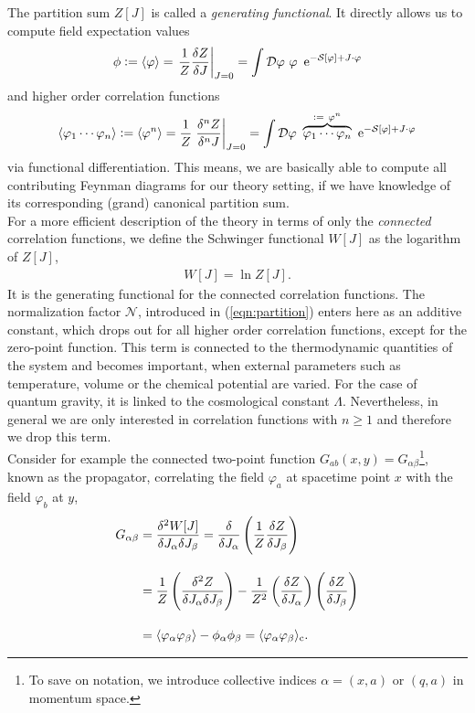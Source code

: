 The partition sum $Z[J]$ is called a \textit{generating functional}. It directly allows us to compute field expectation values
\begin{align}
	\phi := \cf{\varphi} = \eval{\frac{1}{Z}\frac{\delta Z}{\delta J}}_{J=0} = \int \D\varphi \ \varphi \ \operatorname{e}^{-\S + J\cdot\varphi}
\end{align}
and higher order correlation functions
\begin{align}
\cf{\varphi_1 \cdots \varphi_n} := \cf{\varphi^n} = \frac{1}{Z}\eval{\frac{\delta^n Z}{\delta^n J}}_{J=0} = \int \D\varphi \ \overbrace{\varphi_1 \cdots \varphi_n}^{:= \ \varphi^n} \ \operatorname{e}^{-\S + J\cdot\varphi}
\end{align}
via functional differentiation. This means, we are basically able to compute all contributing Feynman diagrams for our theory setting, if we have knowledge of its corresponding (grand) canonical partition sum. \\
 For a more efficient description of the theory in terms of only the \textit{connected} correlation functions, we define the Schwinger functional $W[J]$ as the logarithm of $Z[J]$,  
\begin{align}
W[J] = \ln Z[J].
\label{eqn:Schwinger}
\end{align}
It is the generating functional for the connected correlation functions. The normalization factor $\mathcal{N}$, introduced in (\ref{eqn:partition}) enters here as an additive constant, which drops out for all higher order correlation functions, except for the zero-point function. This term is connected to the thermodynamic quantities of the system and becomes important, when external parameters such as temperature, volume or the chemical potential are varied. For the case of quantum gravity, it is linked to the cosmological constant $\Lambda$. Nevertheless, in general we are only interested in correlation functions with $n\geq 1$ and therefore we drop this term.\\
Consider for example the connected two-point function $G_{ab}(x,y) = G_{\alpha\beta}$\footnote{To save on notation, we introduce collective indices $\alpha = (x,a)$ or $(q,a)$ in momentum space.}, known as the propagator, correlating the field $\varphi_a$ at spacetime point $x$ with the field $\varphi_b$ at $y$,
\begin{equation}
\begin{aligned}
	G_{\alpha\beta} &= \frac{\delta^2W[J]}{\delta J_{\alpha}\delta J_{\beta}} = \frac{\delta}{\delta J_{\alpha}}\left(\frac{1}{Z}\frac{\delta Z}{\delta J_{\beta}}\right)  \\[10pt]
				&= \frac{1}{Z}\left(\frac{\delta^2Z}{\delta J_{\alpha}\delta J_{\beta}}\right) - \frac{1}{Z^2}\left(\frac{\delta Z}{\delta J_{\alpha}}\right)\left(\frac{\delta Z}{\delta J_{\beta}}\right)\\[10pt]
				&= \langle \varphi_{\alpha}\varphi_{\beta} \rangle - \phi_{\alpha}\phi_{\beta} = \langle \varphi_{\alpha}\varphi_{\beta} \rangle_{\text{c}}. 
\end{aligned}
\label{eqn:G_connected}						
\end{equation}
